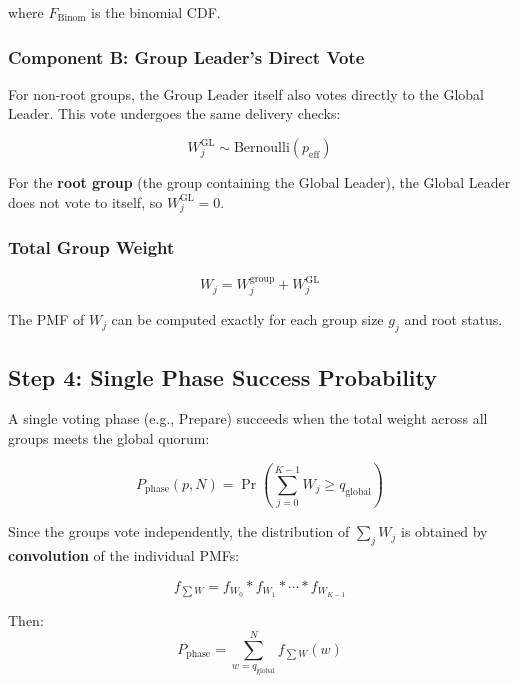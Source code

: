 \documentclass[12pt,a4paper]{article}
\begin{document}
where $F_{\text{Binom}}$ is the binomial CDF.

\subsubsection{Component B: Group Leader's Direct Vote}

For non-root groups, the Group Leader itself also votes directly to the Global Leader. This vote undergoes the same delivery checks:

\begin{equation}
  W_j^{\text{GL}} \sim \text{Bernoulli}(p_{\text{eff}})
  \label{eq:WGL}
\end{equation}

For the \textbf{root group} (the group containing the Global Leader), the Global Leader does not vote to itself, so $W_j^{\text{GL}} = 0$.

\subsubsection{Total Group Weight}

\begin{equation}
  W_j = W_j^{\text{group}} + W_j^{\text{GL}}
  \label{eq:Wj}
\end{equation}

The PMF of $W_j$ can be computed exactly for each group size $g_j$ and root status.

\subsection{Step 4: Single Phase Success Probability}

A single voting phase (e.g., Prepare) succeeds when the total weight across all groups meets the global quorum:

\begin{equation}
  \boxed{P_{\text{phase}}(p, N) = \Pr\left(\sum_{j=0}^{K-1} W_j \geq q_{\text{global}}\right)}
  \label{eq:Pphase}
\end{equation}

Since the groups vote independently, the distribution of $\sum_j W_j$ is obtained by \textbf{convolution} of the individual PMFs:

\begin{equation}
  f_{\sum W} = f_{W_0} * f_{W_1} * \cdots * f_{W_{K-1}}
  \label{eq:convolution}
\end{equation}

Then:
\begin{equation}
  P_{\text{phase}} = \sum_{w = q_{\text{global}}}^{N} f_{\sum W}(w)
  \label{eq:Pphase_sum}
\end{equation}
\end{document}
